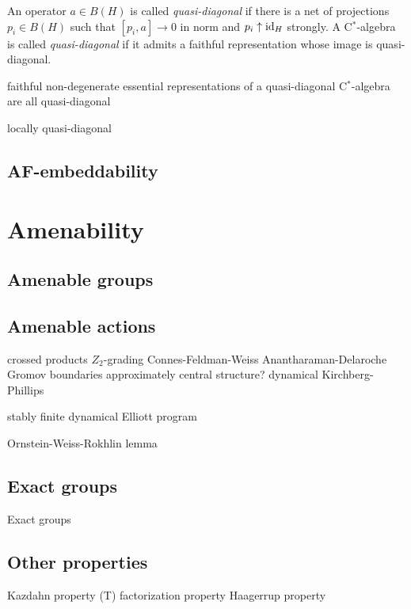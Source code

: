\documentclass{../../large}
\begin{document}
\begin{prb}
\end{prb}


\begin{prb}
An operator $a\in B(H)$ is called \emph{quasi-diagonal} if there is a net of projections $p_i\in B(H)$ such that $[p_i,a]\to0$ in norm and $p_i\uparrow\operatorname{id}_H$ strongly.
A C$^*$-algebra is called \emph{quasi-diagonal} if it admits a faithful representation whose image is quasi-diagonal.
\end{prb}

faithful non-degenerate essential representations of a quasi-diagonal C$^*$-algebra are all quasi-diagonal

locally quasi-diagonal

\section{AF-embeddability}













\chapter{Amenability}


\section{Amenable groups}


\section{Amenable actions}
crossed products
$Z_2$-grading
Connes-Feldman-Weiss
Anantharaman-Delaroche
Gromov boundaries
approximately central structure?
dynamical Kirchberg-Phillips

stably finite
dynamical Elliott program

Ornstein-Weiss-Rokhlin lemma

\section{Exact groups}
Exact groups

\section{Other properties}
Kazdahn property (T)
factorization property
Haagerrup property
\end{document}
